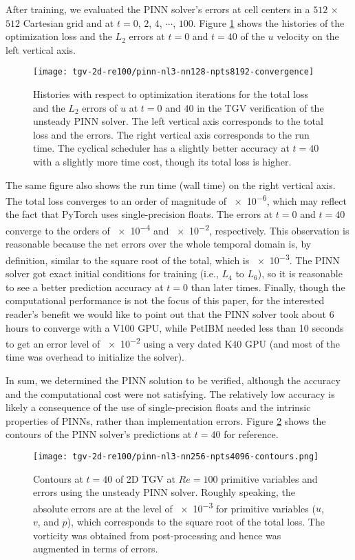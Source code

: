 After training, we evaluated the PINN solver's errors at cell centers in a $512$ $\times$ $512$ Cartesian grid and at $t=0$, $2$, $4$, $\cdots$, $100$.
Figure \ref{fig:tgv-pinn-loss} shows the histories of the optimization loss and the $L_2$ errors at $t=0$ and $t=40$ of the $u$ velocity on the left vertical axis.
\begin{figure}
    \centering%
    \texttt{[image: tgv-2d-re100/pinn-nl3-nn128-npts8192-convergence]}%
    \caption{%
        Histories with respect to optimization iterations for the total loss and the $L_2$ errors of $u$ at $t=0$ and $40$ in the TGV verification of the unsteady PINN solver.
        The left vertical axis corresponds to the total loss and the errors.
        The right vertical axis corresponds to the run time.
        The cyclical scheduler has a slightly better accuracy at $t=40$ with a slightly more time cost, though its total loss is higher.
    }
    \label{fig:tgv-pinn-loss}%
\end{figure}
The same figure also shows the run time (wall time) on the right vertical axis.
The total loss converges to an order of magnitude of \num{e-6}, which may reflect the fact that PyTorch uses single-precision floats.
The errors at $t=0$ and $t=40$ converge to the orders of \num{e-4} and \num{e-2}, respectively.
This observation is reasonable because the net errors over the whole temporal domain is, by definition, similar to the square root of the total, which is \num{e-3}.
The PINN solver got exact initial conditions for training (i.e., $L_4$ to $L_6$), so it is reasonable to see a better prediction accuracy at $t=0$ than later times.
Finally, though the computational performance is not the focus of this paper, for the interested reader's benefit we would like to point out that the PINN solver took about 6 hours to converge with a V100 GPU, while PetIBM needed less than 10 seconds to get an error level of \num{e-2} using a very dated K40 GPU (and most of the time was overhead to initialize the solver).

In sum, we determined the PINN solution to be verified, although the accuracy and the computational cost were not satisfying.
The relatively low accuracy is likely a consequence of the use of single-precision floats and the intrinsic properties of PINNs, rather than implementation errors.
Figure \ref{fig:tgv-pinn-contours} shows the contours of the PINN solver's predictions at $t=40$ for reference.

\begin{figure}[t]
    \centering%
    \texttt{[image: tgv-2d-re100/pinn-nl3-nn256-npts4096-contours.png]}
    \caption{%
        Contours at $t=40$ of 2D TGV at $Re=\num{100}$ primitive variables and errors using the unsteady PINN solver.
        Roughly speaking, the absolute errors are at the level of \num{e-3} for primitive variables ($u$, $v$, and $p$), which corresponds to the square root of the total loss.
        The vorticity was obtained from post-processing and hence was augmented in terms of errors.
    }
    \label{fig:tgv-pinn-contours}%
\end{figure}

